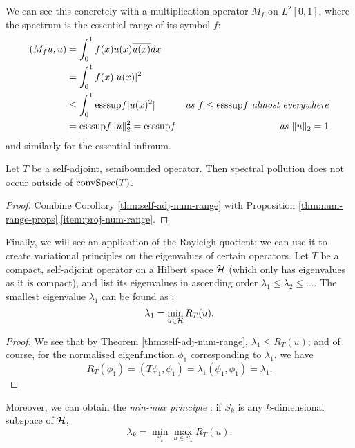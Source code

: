 \documentclass[../main.tex]{subfiles}
\begin{document}
\begin{example}
  We can see this concretely with a multiplication operator $M_f$ on $L^2[0, 1]$,
  where the spectrum is the essential range of its symbol $f$:
  \begin{align*}
    (M_f u, u) & = \int_0^1 f(x)u(x)\overline{u(x)} dx & \\
               & = \int_0^1 f(x)|u(x)|^2 & \\
               & \leq \int_0^1 \mathrm{esssup} f |u(x)^2| 
                 & \text{\emph{as $f \leq \mathrm{esssup}f$ almost everywhere}} \\
               & = \mathrm{esssup} f \|u\|_2^2 = \mathrm{esssup} f 
                 & \text{\emph{as $\|u\|_2 = 1$}} \\
  \end{align*}
  and similarly for the essential infimum.
\end{example}

\begin{corollary}\label{thm:poll-bound-num}
  Let $T$ be a self-adjoint, semibounded operator.
  Then spectral pollution does not occur outside of $\mathrm{conv}\mathrm{Spec}(T)$.
\end{corollary}
\begin{proof}
Combine Corollary \ref{thm:self-adj-num-range} with Proposition
\ref{thm:num-range-props}.\ref{item:proj-num-range}. 
\end{proof}

\begin{remark}
Finally, we will see an application of the Rayleigh quotient: we can use it
to create variational principles on the eigenvalues of certain operators.
  Let $T$ be a compact, self-adjoint operator on a Hilbert space $\mathcal{H}$
  (which only has eigenvalues as it is
  compact), and list its eigenvalues in ascending order $\lambda_1 \leq \lambda_2 \leq \hdots$.
  The smallest eigenvalue $\lambda_1$ can be found as \cite{evans2010partial}:
$$\lambda_1 = \min_{u \in \mathcal{H}} R_T(u).$$
\begin{proof}
  We see that by Theorem \ref{thm:self-adj-num-range},
  $\lambda_1 \leq R_T(u)$; and of course, for the normalised eigenfunction
  $\phi_1$ corresponding to $\lambda_1$, we have
  $$R_T(\phi_1) = (T\phi_1, \phi_1) = \lambda_1(\phi_1, \phi_1) = \lambda_1.$$
\end{proof}

  Moreover, we can obtain the \emph{min-max principle} \cite{pryce1993numerical}:
  if $S_k$ is any $k$-dimensional subspace of $\mathcal{H}$,
  $$\lambda_k = \min_{S_k} \max_{u \in S_k} R_T(u).$$
\end{remark}
\end{document}
